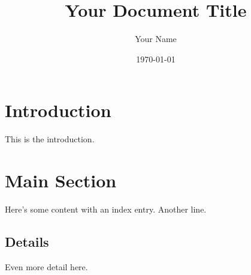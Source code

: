 \documentclass[12pt,a5paper]{article}
\title{Your Document Title}
\author{Your Name}
\date{\today}
\begin{document}
\maketitle

\tableofcontents
\newpage

\section{Introduction}
This is the introduction.

\section{Main Section}
Here's some content with an index entry.
Another line.

\subsection{Details}
Even more detail here.

\newpage
\printbibliography

\newpage
\printindex
\end{document}
